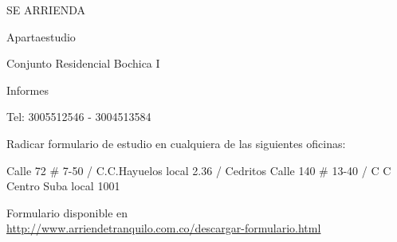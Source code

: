 \documentclass[final]{beamer}
\date{Jul. 31th, 2007}
\begin{document}
  \begin{frame}{}
\centering
  \begin{block}
  \centering
      {\VeryHuge \begin{center}
      SE ARRIENDA
      \end{center}}\par
      {\Large \begin{center}
      Apartaestudio
      \end{center}}\par
      {\large \begin{center}
      Conjunto Residencial Bochica I
      \end{center}}\par
      {\large \begin{center}
      Informes
      \end{center}}\par
      {\Large \begin{center}
      Tel: 3005512546 - 3004513584 \end{center}}\par
      {\footnotesize \begin{center}
      Radicar formulario de estudio en cualquiera de las siguientes oficinas:\end{center}}\par
      {\footnotesize Calle 72 \# 7-50 / C.C.Hayuelos local 2.36  /  Cedritos Calle 140 \# 13-40 / C C Centro Suba   local 1001}\par
      {\normalsize Formulario disponible en\\ \url{http://www.arriendetranquilo.com.co/descargar-formulario.html}}\par
  \end{block}
  \end{frame}
\end{document}
